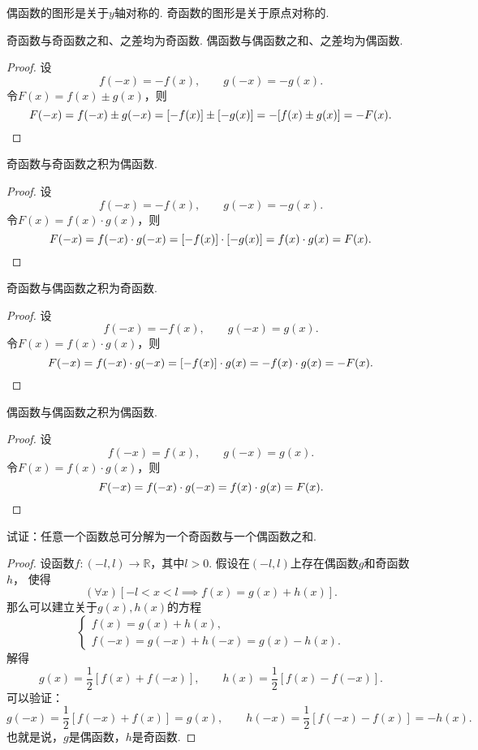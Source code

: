 \begin{property}
偶函数的图形是关于\(y\)轴对称的.
奇函数的图形是关于原点对称的.
\end{property}

\begin{property}
奇函数与奇函数之和、之差均为奇函数.
偶函数与偶函数之和、之差均为偶函数.
\begin{proof}
设\[
f(-x) = -f(x), \qquad g(-x) = -g(x).
\]令\(F(x) = f(x) \pm g(x)\)，则\[
F(-x) = f(-x) \pm g(-x)
= [-f(x)] \pm [-g(x)]
= -[f(x) \pm g(x)]
= -F(x).
\qedhere
\]
\end{proof}
\end{property}

\begin{property}
奇函数与奇函数之积为偶函数.
\begin{proof}
设\[
f(-x) = -f(x), \qquad g(-x) = -g(x).
\]令\(F(x) = f(x) \cdot g(x)\)，则\[
F(-x) = f(-x) \cdot g(-x)
= [-f(x)] \cdot [-g(x)]
= f(x) \cdot g(x)
= F(x).
\qedhere
\]
\end{proof}
\end{property}

\begin{property}
奇函数与偶函数之积为奇函数.
\begin{proof}
设\[
f(-x) = -f(x), \qquad g(-x) = g(x).
\]令\(F(x) = f(x) \cdot g(x)\)，则\[
F(-x) = f(-x) \cdot g(-x)
= [-f(x)] \cdot g(x)
= - f(x) \cdot g(x)
= - F(x).
\qedhere
\]
\end{proof}
\end{property}

\begin{property}
偶函数与偶函数之积为偶函数.
\begin{proof}
设\[
f(-x) = f(x), \qquad g(-x) = g(x).
\]令\(F(x) = f(x) \cdot g(x)\)，则\[
F(-x) = f(-x) \cdot g(-x) = f(x) \cdot g(x) = F(x).
\qedhere
\]
\end{proof}
\end{property}

\begin{example}\label{example:函数.任一函数可拆为奇偶函数之和}
试证：任意一个函数总可分解为一个奇函数与一个偶函数之和.
\begin{proof}
设函数\(f\colon(-l,l)\to\mathbb{R}\)，其中\(l>0\).
假设在\((-l,l)\)上存在偶函数\(g\)和奇函数\(h\)，
使得\[
	(\forall x)
	[-l<x<l \implies f(x) = g(x)+h(x)].
\]
那么可以建立关于\(g(x),h(x)\)的方程\[
	\left\{ \begin{array}{l}
		f(x) = g(x) + h(x), \\
		f(-x) = g(-x) + h(-x) = g(x) - h(x).
	\end{array} \right.
\]
解得\[
	g(x) = \frac12 [f(x) + f(-x)], \qquad
	h(x) = \frac12 [f(x) - f(-x)].
\]
可以验证：\[
	g(-x) = \frac12 [f(-x) + f(x)] = g(x), \qquad
	h(-x) = \frac12 [f(-x) - f(x)] = -h(x).
\]
也就是说，\(g\)是偶函数，\(h\)是奇函数.
\end{proof}
\end{example}

